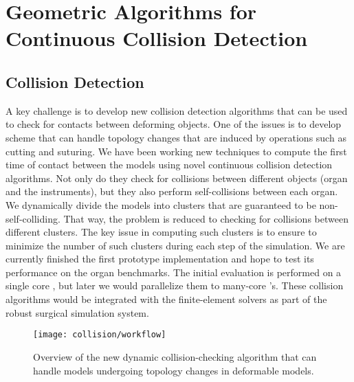 
\section{Geometric Algorithms for Continuous Collision Detection}\label{sec:continuous_collision}

\subsection{Collision Detection}\label{ssec:collision_detection}
A key challenge is to develop new collision detection algorithms that can be used to check for contacts between deforming objects. One of the issues is to develop scheme that can handle topology changes that are induced by operations such as cutting and suturing. We have been working new techniques to compute the first time of contact between the models using novel continuous collision detection algorithms. Not only do they check for collisions between different objects (\eg organ and the instruments), but they also perform self-collisions between each organ. We dynamically divide the models into clusters that are guaranteed to be non-self-colliding. That way, the problem is reduced to checking for collisions between different clusters. The key issue in computing such clusters is to ensure to minimize the number of such clusters during each step of the simulation. We are currently finished the first prototype implementation and hope to test its performance on the organ benchmarks. The initial evaluation is performed on a single core , but later we would parallelize them to many-core 's. These collision algorithms would be integrated with the finite-element solvers as part of the robust surgical simulation system.

\begin{figure}
  \centering%
  \texttt{[image: collision/workflow]}
  \caption{Overview of the new dynamic collision-checking algorithm that can handle models undergoing topology changes in deformable models. }\label{fig:dynamic_collision}
\end{figure}

